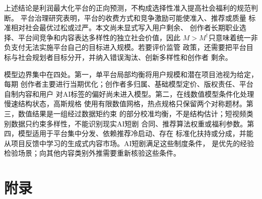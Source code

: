 \documentclass[UTF8, a4paper, 12pt, fontset=fandol]{ctexart}
\theoremstyle{definition}
\theoremstyle{remark}
\begin{document}
上述结论是利润最大化平台的正向预测，不构成选择性准入提高社会福利的规范判断。
平台治理研究表明，平台的收费方式和竞争激励可能使准入、推荐或质量
标准相对社会最优过松或过严\citep{teh2022governance}。本文尚未显式写入用户剩余、
创作者长期职业选择、平台间竞争和内容表达多样性的独立社会价值，因此
$M>M^\dagger$只意味着统一非负支付无法实施平台自己的目标进入规模。若要评价监管
政策，还需要把平台目标与社会规划者目标分开，并纳入错误淘汰、创新多样性和创作者
剩余。

模型边界集中在四处。第一，单平台局部均衡将用户规模和潜在项目池视为给定，每期
创作者主要进行当期优化；创作者多归属、基础模型定价、版权责任、平台自制内容和用户
对AI标签的偏好尚未进入模型。第二，在线数值模型条件化处理慢速结构状态，高斯规格
使用有限数值网格，热点规格只保留两个对称题材。第三，数值结果是一组经过数据矩约束
的部分校准均衡，不是结构估计；短视频类别数据只约束多样性，不能识别现实AI短剧
合同、推荐算法权重或福利参数。第四，模型适用于平台集中分发、依赖推荐冷启动、存在
标准化扶持或分成，并能从项目反馈中学习的生成式内容市场。AI短剧满足这些制度条件，
是优先的经验检验场景；向其他内容类别外推需要重新核验这些条件。

\section{附录}
\label{sec:appendix}
\end{document}
